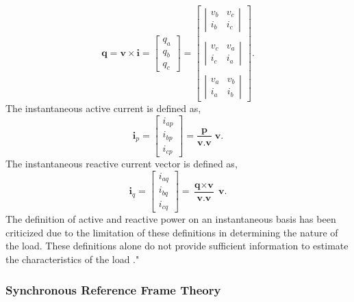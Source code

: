 \begin{equation}
\textbf {{q}}=\textbf {{v}} \times \textbf{{i}} = \begin{bmatrix} q_a \\ q_b \\ q_c \end{bmatrix} = \begin{bmatrix} \left| \begin{array}{cc} v_b & v_c \\  i_b & i_c\end{array}\right| \\ \\ \left| \begin{array}{cc} v_c & v_a \\ i_c & i_a \end{array}\right| \\ \\ \left| \begin{array}{cc} v_a & v_b \\ i_a & i_b \end{array}\right| \end{bmatrix}.
\label{eqn2.33}
\end{equation} 
 The instantaneous active current is defined as,  
 \begin{equation}
 \textbf{{i}}_p =  \begin{bmatrix} i_{ap} \\ i_{bp} \\ i_{cp} \end{bmatrix} = \frac{\textbf{{p}}}{\textbf{{v}}.\textbf{{v}}} \; \textbf{{v}}.
 \label{eqn2.34}
 \end{equation} 
 The instantaneous reactive current vector is defined as, 
  \begin{equation}
 \textbf{{i}}_q =  \begin{bmatrix} i_{aq} \\ i_{bq} \\ i_{cq} \end{bmatrix} = \frac{\textbf{{q}}\times \textbf{{v}} }{\textbf{{v}}.\textbf{{v}}} \; \textbf{{v}}.
 \label{eqn2.35}
 \end{equation} 
The definition of active and reactive power on an instantaneous basis has been criticized due to the limitation of these definitions in determining the nature of the load. These definitions alone do not provide sufficient information to estimate the characteristics of the load \cite{czarnecki2004some}."


 \subsubsection{Synchronous Reference Frame Theory \cite{Benhabib2005353,SrinivasBhaskar}}
 
